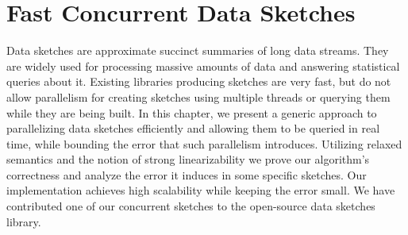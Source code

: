 \chapter{Fast Concurrent Data Sketches}
\label{chap:fast-concurrent-data-sketches}

Data sketches are approximate succinct summaries of long data streams. They are widely used
for processing massive amounts of data and answering statistical queries about it.
Existing libraries producing sketches are very fast, but do not allow parallelism for 
creating sketches using multiple threads or querying them while
they are being built. In this chapter, we present a generic approach to parallelizing data sketches efficiently and
allowing them to be queried in real time,
while bounding the error that such parallelism introduces. Utilizing relaxed semantics and 
the notion of strong linearizability we prove our algorithm's correctness and analyze the 
error it induces in some specific sketches.
Our implementation achieves high scalability while keeping the error small. We have contributed
one of our concurrent sketches to the open-source data sketches library.

















%
%


